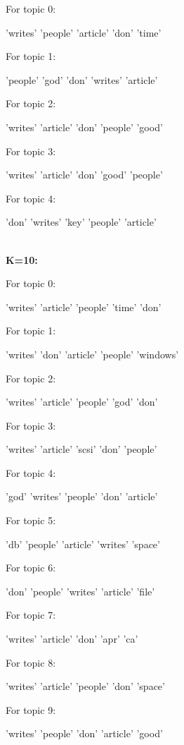 \documentclass[12pt]{article}
\begin{document}
\begin{multicols}{2}
\par
For topic 0:
\par
'writes' 'people' 'article' 'don' 'time' \par
For topic 1:
\par
'people' 'god' 'don' 'writes' 'article' 
\par

For topic 2:
\par
'writes' 'article' 'don' 'people' 'good' \par
For topic 3:
\par
'writes' 'article' 'don' 'good' 'people' 
\par
For topic 4:
\par
'don' 'writes' 'key' 'people' 'article' 
~\\
~\\
\end{multicols}
\par
{\bf K=10:}
\par
\begin{multicols}{2}
For topic 0:
\par
'writes' 'article' 'people' 'time' 'don' \par
For topic 1:
\par
'writes' 'don' 'article' 'people' 'windows' \par
For topic 2:
\par
'writes' 'article' 'people' 'god' 'don' \par
For topic 3:
\par
'writes' 'article' 'scsi' 'don' 'people' \par
For topic 4:
\par
'god' 'writes' 'people' 'don' 'article' \par
For topic 5:
\par
'db' 'people' 'article' 'writes' 'space' \par
For topic 6:
\par
'don' 'people' 'writes' 'article' 'file' \par
For topic 7:
\par
'writes' 'article' 'don' 'apr' 'ca' \par
For topic 8:
\par
'writes' 'article' 'people' 'don' 'space' \par
For topic 9:
\par
'writes' 'people' 'don' 'article' 'good'
\end{multicols}
\par
\end{document}

